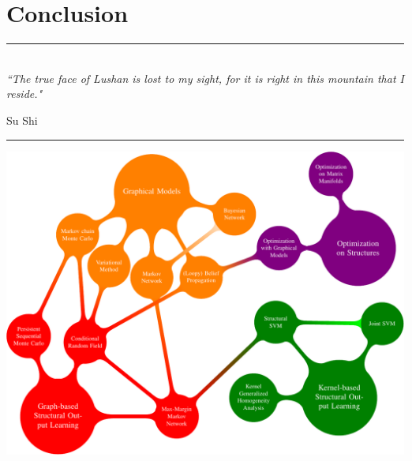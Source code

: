 
\chapter{Conclusion} %

\label{Chapter6} %


\rule{\textwidth}{0.4pt} \\[0.5cm]
\textit{``The true face of Lushan is lost to my sight, for it is right in this mountain that I reside."}

\begin{flushright}
Su Shi
\end{flushright}
\rule{\textwidth}{0.4pt} 


\includegraphics[width=\textwidth]{./Figures/Conclusion_figure-crop}


